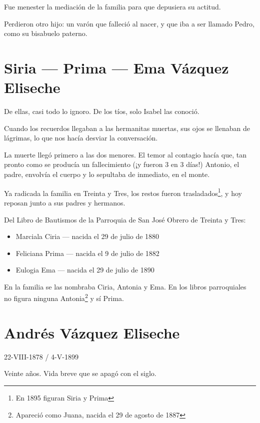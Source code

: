 \documentclass[a4paper]{article}
\begin{document}
Fue menester la mediación de la familia para que depusiera su actitud.

\bigbreak{}

Perdieron otro hijo: un varón que falleció al nacer, y que iba a ser llamado Pedro, como su bisabuelo paterno.

\section{Siria --- Prima --- Ema Vázquez Eliseche}

De ellas, casi todo lo ignoro. De los tíos, solo Isabel las conoció.

Cuando los recuerdos llegaban a las hermanitas muertas, sus ojos se llenaban de lágrimas, lo que nos hacía desviar la conversación.

La muerte llegó primero a las dos menores. El temor al contagio hacía que, tan pronto como se producía un fallecimiento (¡y fueron 3 en 3 días!) Antonio, el padre, envolvía el cuerpo y lo sepultaba de inmediato, en el monte.

Ya radicada la familia en Treinta y Tres, los restos fueron trasladados\footnote{En 1895 figuran Siria y Prima}, y hoy reposan junto a sus padres y hermanos.

\bigbreak{}

Del Libro de Bautismos de la Parroquia de San José Obrero de Treinta y Tres:

\begin{itemize}
    \item{Marciala Ciria --- nacida el 29 de julio de 1880}
    \item{Feliciana Prima --- nacida el 9 de julio de 1882}
    \item{Eulogia Ema --- nacida el 29 de julio de 1890}
\end{itemize}

En la familia se las nombraba Ciria, Antonia y Ema. En los libros parroquiales no figura ninguna Antonia\footnote{Apareció como Juana, nacida el 29 de agosto de 1887} y sí Prima.

\section{Andrés Vázquez Eliseche}

22-VIII-1878 / 4-V-1899

\bigbreak{}

Veinte años. Vida breve que se apagó con el siglo.
\end{document}
